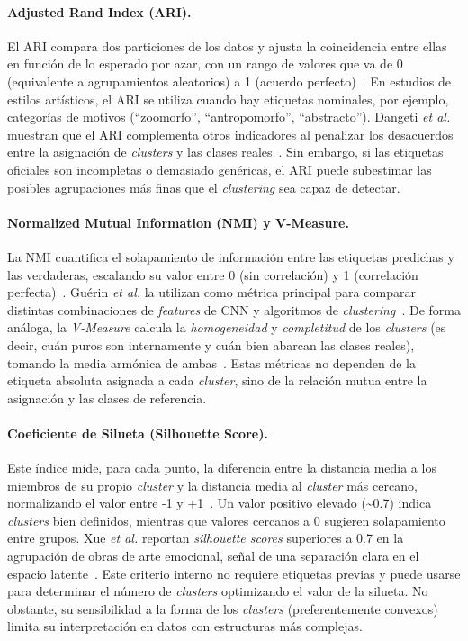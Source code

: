 \paragraph{Adjusted Rand Index (ARI).} El ARI compara dos particiones de los datos y ajusta la coincidencia entre ellas en función de lo esperado por azar, con un rango de valores que va de 0 (equivalente a agrupamientos aleatorios) a 1 (acuerdo perfecto)~\cite{gultepe2018,guerin2018}.
En estudios de estilos artísticos, el ARI se utiliza cuando hay etiquetas nominales, por ejemplo, categorías de motivos (“zoomorfo”, “antropomorfo”, “abstracto”).
Dangeti \textit{et al.} muestran que el ARI complementa otros indicadores al penalizar los desacuerdos entre la asignación de \textit{clusters} y las clases reales~\cite{dangeti2024}.
Sin embargo, si las etiquetas oficiales son incompletas o demasiado genéricas, el ARI puede subestimar las posibles agrupaciones más finas que el \textit{clustering} sea capaz de detectar.

\paragraph{Normalized Mutual Information (NMI) y V-Measure.}
La NMI cuantifica el solapamiento de información entre las etiquetas predichas y las verdaderas, escalando su valor entre 0 (sin correlación) y 1 (correlación perfecta)~\cite{dangeti2024,guerin2018}.
Guérin \textit{et al.} la utilizan como métrica principal para comparar distintas combinaciones de \textit{features} de CNN y algoritmos de \textit{clustering}~\cite{guerin2018}.
De forma análoga, la \textit{V-Measure} calcula la \emph{homogeneidad} y \emph{completitud} de los \textit{clusters} (es decir, cuán puros son internamente y cuán bien abarcan las clases reales), tomando la media armónica de ambas~\cite{li2010}.
Estas métricas no dependen de la etiqueta absoluta asignada a cada \textit{cluster}, sino de la relación mutua entre la asignación y las clases de referencia.

\paragraph{Coeficiente de Silueta (Silhouette Score).}
Este índice mide, para cada punto, la diferencia entre la distancia media a los miembros de su propio \textit{cluster} y la distancia media al \textit{cluster} más cercano, normalizando el valor entre -1 y +1~\cite{dangeti2024,gultepe2018}.
Un valor positivo elevado (\textasciitilde 0.7) indica \textit{clusters} bien definidos, mientras que valores cercanos a 0 sugieren solapamiento entre grupos.
Xue \textit{et al.} reportan \textit{silhouette scores} superiores a 0.7 en la agrupación de obras de arte emocional, señal de una separación clara en el espacio latente~\cite{gultepe2018}.
Este criterio interno no requiere etiquetas previas y puede usarse para determinar el número de \textit{clusters} optimizando el valor de la silueta.
No obstante, su sensibilidad a la forma de los \textit{clusters} (preferentemente convexos) limita su interpretación en datos con estructuras más complejas.

